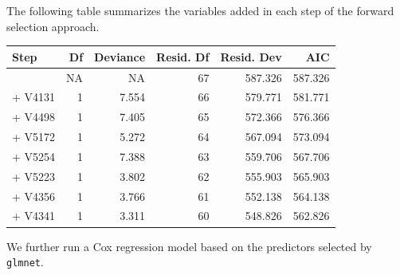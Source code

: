 \documentclass[
]{book}
\newenvironment{Shaded}{\begin{snugshade}}{\end{snugshade}}
\newcommand{\AttributeTok}[1]{\textcolor[rgb]{0.77,0.63,0.00}{#1}}
\newcommand{\ConstantTok}[1]{\textcolor[rgb]{0.00,0.00,0.00}{#1}}
\newcommand{\DecValTok}[1]{\textcolor[rgb]{0.00,0.00,0.81}{#1}}
\newcommand{\FloatTok}[1]{\textcolor[rgb]{0.00,0.00,0.81}{#1}}
\newcommand{\FunctionTok}[1]{\textcolor[rgb]{0.00,0.00,0.00}{#1}}
\newcommand{\NormalTok}[1]{#1}
\newcommand{\OtherTok}[1]{\textcolor[rgb]{0.56,0.35,0.01}{#1}}
\newcommand{\SpecialCharTok}[1]{\textcolor[rgb]{0.00,0.00,0.00}{#1}}
\newcommand{\StringTok}[1]{\textcolor[rgb]{0.31,0.60,0.02}{#1}}
\begin{document}
The following table summarizes the variables added in each step of the forward selection approach.

\begin{Shaded}
\end{Shaded}

\begin{tabular}{lrrrrr}
\toprule
Step & Df & Deviance & Resid. Df & Resid. Dev & AIC\\
\midrule
 & NA & NA & 67 & 587.326 & 587.326\\
+ V4131 & 1 & 7.554 & 66 & 579.771 & 581.771\\
+ V4498 & 1 & 7.405 & 65 & 572.366 & 576.366\\
+ V5172 & 1 & 5.272 & 64 & 567.094 & 573.094\\
+ V5254 & 1 & 7.388 & 63 & 559.706 & 567.706\\
\addlinespace
+ V5223 & 1 & 3.802 & 62 & 555.903 & 565.903\\
+ V4356 & 1 & 3.766 & 61 & 552.138 & 564.138\\
+ V4341 & 1 & 3.311 & 60 & 548.826 & 562.826\\
\bottomrule
\end{tabular}

We further run a Cox regression model based on the predictors selected by \texttt{glmnet}.

\begin{Shaded}
\end{Shaded}
\end{document}
